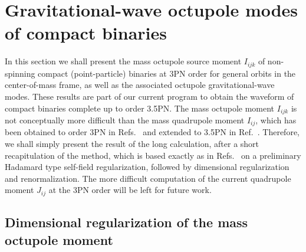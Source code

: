 \documentclass[prd,preprint,superscriptaddress,tightenlines,nofootinbib,
  eqsecnum,showpacs]{revtex4}
\begin{document}
\section{Gravitational-wave octupole modes of compact binaries}
\label{sec:octupole}

In this section we shall present the mass octupole source moment
$I_{ijk}$ of non-spinning compact (point-particle) binaries at 3PN
order for general orbits in the center-of-mass frame, as well as the
associated octupole gravitational-wave modes. These results are part
of our current program to obtain the waveform of compact binaries
complete up to order 3.5PN. The mass octupole moment $I_{ijk}$ is not
conceptually more difficult than the mass quadrupole moment $I_{ij}$,
which has been obtained to order 3PN in Refs.~\cite{BI04mult, BDEI04,
  BDEI05dr} and extended to 3.5PN in Ref.~\cite{FMBI12}. Therefore, we
shall simply present the result of the long calculation, after a short
recapitulation of the method, which is based exactly as in
Refs.~\cite{BI04mult, BDEI04, BDEI05dr} on a preliminary Hadamard type
self-field regularization, followed by dimensional regularization and
renormalization. The more difficult computation of the current
quadrupole moment $J_{ij}$ at the 3PN order will be left for future
work.

\subsection{Dimensional regularization of the mass octupole moment}
\label{sec:DR}
\end{document}
